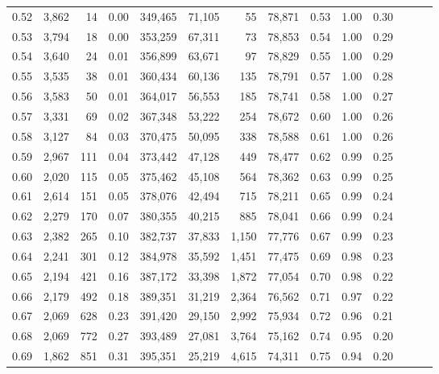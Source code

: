 \begin{tabular}{rrrrrrrrrrrrrr}
0.52 &   3,862 &     14 &  0.00 &  349,465 &   71,105 &      55 &  78,871 &  0.53 &  1.00 &      0.30 \\
0.53 &   3,794 &     18 &  0.00 &  353,259 &   67,311 &      73 &  78,853 &  0.54 &  1.00 &      0.29 \\
0.54 &   3,640 &     24 &  0.01 &  356,899 &   63,671 &      97 &  78,829 &  0.55 &  1.00 &      0.29 \\
0.55 &   3,535 &     38 &  0.01 &  360,434 &   60,136 &     135 &  78,791 &  0.57 &  1.00 &      0.28 \\
0.56 &   3,583 &     50 &  0.01 &  364,017 &   56,553 &     185 &  78,741 &  0.58 &  1.00 &      0.27 \\
0.57 &   3,331 &     69 &  0.02 &  367,348 &   53,222 &     254 &  78,672 &  0.60 &  1.00 &      0.26 \\
0.58 &   3,127 &     84 &  0.03 &  370,475 &   50,095 &     338 &  78,588 &  0.61 &  1.00 &      0.26 \\
0.59 &   2,967 &    111 &  0.04 &  373,442 &   47,128 &     449 &  78,477 &  0.62 &  0.99 &      0.25 \\
0.60 &   2,020 &    115 &  0.05 &  375,462 &   45,108 &     564 &  78,362 &  0.63 &  0.99 &      0.25 \\
0.61 &   2,614 &    151 &  0.05 &  378,076 &   42,494 &     715 &  78,211 &  0.65 &  0.99 &      0.24 \\
0.62 &   2,279 &    170 &  0.07 &  380,355 &   40,215 &     885 &  78,041 &  0.66 &  0.99 &      0.24 \\
0.63 &   2,382 &    265 &  0.10 &  382,737 &   37,833 &   1,150 &  77,776 &  0.67 &  0.99 &      0.23 \\
0.64 &   2,241 &    301 &  0.12 &  384,978 &   35,592 &   1,451 &  77,475 &  0.69 &  0.98 &      0.23 \\
0.65 &   2,194 &    421 &  0.16 &  387,172 &   33,398 &   1,872 &  77,054 &  0.70 &  0.98 &      0.22 \\
0.66 &   2,179 &    492 &  0.18 &  389,351 &   31,219 &   2,364 &  76,562 &  0.71 &  0.97 &      0.22 \\
0.67 &   2,069 &    628 &  0.23 &  391,420 &   29,150 &   2,992 &  75,934 &  0.72 &  0.96 &      0.21 \\
0.68 &   2,069 &    772 &  0.27 &  393,489 &   27,081 &   3,764 &  75,162 &  0.74 &  0.95 &      0.20 \\
0.69 &   1,862 &    851 &  0.31 &  395,351 &   25,219 &   4,615 &  74,311 &  0.75 &  0.94 &      0.20 \\

\end{tabular}
